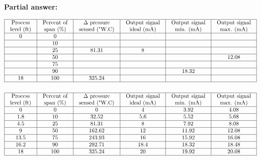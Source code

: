 





\noindent
{\bf Partial answer:}


$$\vbox{\offinterlineskip
\halign{\strut
\vrule \quad\hfil # \ \hfil & 
\vrule \quad\hfil # \ \hfil & 
\vrule \quad\hfil # \ \hfil & 
\vrule \quad\hfil # \ \hfil & 
\vrule \quad\hfil # \ \hfil & 
\vrule \quad\hfil # \ \hfil \vrule \cr
\noalign{\hrule}
%
Process & Percent of & $\Delta$ pressure & Output signal & Output signal & Output signal \cr
%
level (ft) & span (\%) & sensed ("W.C) & ideal (mA) & min. (mA) & max. (mA) \cr
%
\noalign{\hrule}
%
0  & 0 &  &  &  &  \cr
%
\noalign{\hrule}
%
  & 10 &  &  &  &  \cr
%
\noalign{\hrule}
%
  & 25 & 81.31 & 8 &  &  \cr
%
\noalign{\hrule}
%
  & 50 &  &  &  & 12.08 \cr
%
\noalign{\hrule}
%
  & 75 &  &  &  &  \cr
%
\noalign{\hrule}
%
  & 90 &  &  & 18.32 &  \cr
%
\noalign{\hrule}
%
18 & 100 & 325.24 &  &  &  \cr
%
\noalign{\hrule}
} %
}$$ %








$$\vbox{\offinterlineskip
\halign{\strut
\vrule \quad\hfil # \ \hfil & 
\vrule \quad\hfil # \ \hfil & 
\vrule \quad\hfil # \ \hfil & 
\vrule \quad\hfil # \ \hfil & 
\vrule \quad\hfil # \ \hfil & 
\vrule \quad\hfil # \ \hfil \vrule \cr
\noalign{\hrule}
%
Process & Percent of & $\Delta$ pressure & Output signal & Output signal & Output signal \cr
%
level (ft) & span (\%) & sensed ("W.C) & ideal (mA) & min. (mA) & max. (mA) \cr
%
\noalign{\hrule}
%
0 & 0 & 0 & 4 & 3.92 & 4.08 \cr
%
\noalign{\hrule}
%
1.8 & 10 & 32.52 & 5.6 & 5.52 & 5.68 \cr
%
\noalign{\hrule}
%
4.5 & 25 & 81.31 & 8 & 7.92 & 8.08 \cr
%
\noalign{\hrule}
%
9 & 50 & 162.62 & 12 & 11.92 & 12.08 \cr
%
\noalign{\hrule}
%
13.5 & 75 & 243.93 & 16 & 15.92 & 16.08 \cr
%
\noalign{\hrule}
%
16.2 & 90 & 292.71 & 18.4 & 18.32 & 18.48 \cr
%
\noalign{\hrule}
%
18 & 100 & 325.24 & 20 & 19.92 & 20.08 \cr
%
\noalign{\hrule}
} %
}$$ %






